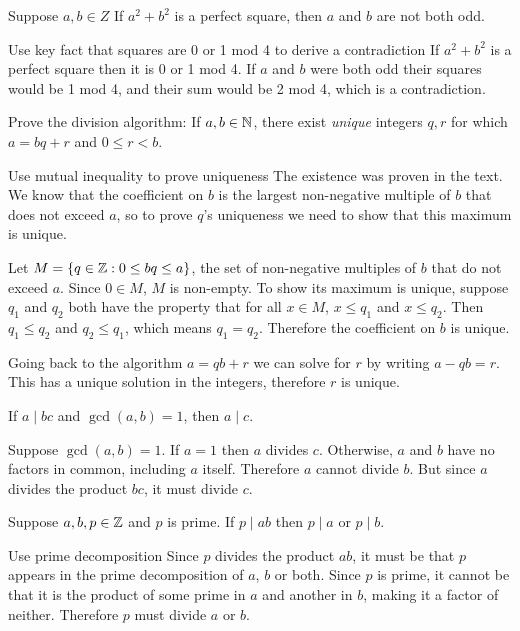 \documentclass{article}
\begin{document}
\begin{problem}
Suppose $a, b \in Z$ If $a^2 + b^2$ is a perfect square, then $a$ and $b$ are not both odd.
\end{problem}
\begin{solution}{Use key fact that squares are 0 or 1 mod 4 to derive a contradiction}
    If $a^2 + b^2$ is a perfect square then it is 0 or 1 mod 4. If $a$ and $b$ were both odd their squares would be 1 mod 4, and their sum would be 2 mod 4, which is a contradiction.
\end{solution}

\begin{problem}
Prove the division algorithm: If $a, b \in \mathbb{N}$, there exist \textit{unique} integers $q, r$ for which $a = bq + r$ and $0 \leq r < b$.
\end{problem}
\begin{solution}{Use mutual inequality to prove uniqueness}
    The existence was proven in the text. We know that the coefficient on $b$ is the largest non-negative multiple of $b$ that does not exceed $a$, so to prove $q$'s uniqueness we need to show that this maximum is unique.

    Let $M = \{q \in \mathbb{Z}: 0 \leq bq \leq a \}$, the set of non-negative multiples of $b$ that do not exceed $a$. Since $0 \in M$, $M$ is non-empty. To show its maximum is unique, suppose $q_1$ and $q_2$ both have the property that for all $x \in M$, $x \leq q_1$ and $x \leq q_2$. Then $q_1 \leq q_2$ and $q_2 \leq q_1$, which means $q_1 = q_2$. Therefore the coefficient on $b$ is unique.

    Going back to the algorithm $a = qb + r$ we can solve for $r$ by writing $a - qb = r$. This has a unique solution in the integers, therefore $r$ is unique.
\end{solution}

\begin{problem}
If $a \mid bc$ and $\gcd(a, b) = 1$, then $a \mid c$.
\end{problem}
\begin{solution}{}
    Suppose $\gcd(a,b) = 1$. If $a = 1$ then $a$ divides $c$. Otherwise, $a$ and $b$ have no factors in common, including $a$ itself. Therefore $a$ cannot divide $b$. But since $a$ divides the product $bc$, it must divide $c$.
\end{solution}

\begin{problem}
Suppose $a, b, p \in \mathbb{Z}$ and $p$ is prime. If $p \mid ab$ then $p \mid a$ or $p \mid b$.
\end{problem}
\begin{solution}{Use prime decomposition}
    Since $p$ divides the product $ab$, it must be that $p$ appears in the prime decomposition of $a$, $b$ or both. Since $p$ is prime, it cannot be that it is the product of some prime in $a$ and another in $b$, making it a factor of neither. Therefore $p$ must divide $a$ or $b$.
\end{solution}
\end{document}
